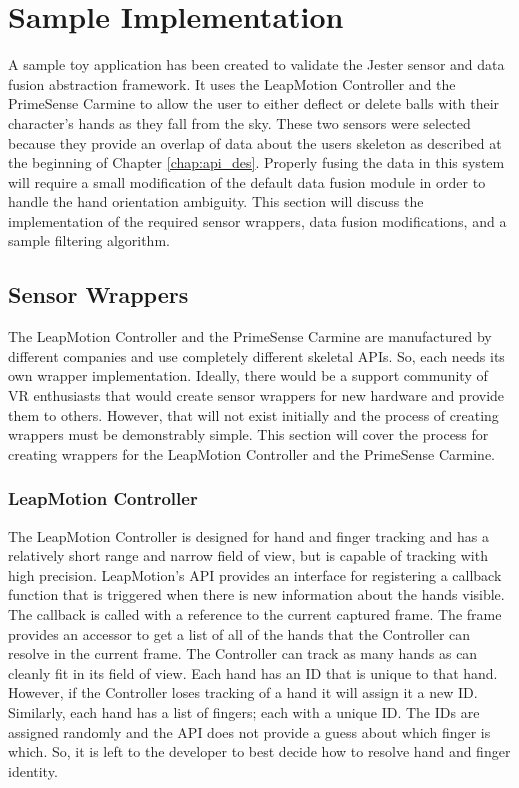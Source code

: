 \chapter{Sample Implementation}\label{chap:sample_app}

A sample toy application has been created to validate the Jester sensor and data fusion abstraction framework. It uses the LeapMotion Controller and the PrimeSense Carmine to allow the user to either deflect or delete balls with their character's hands as they fall from the sky. These two sensors were selected because they provide an overlap of data about the users skeleton as described at the beginning of Chapter \ref{chap:api_des}. Properly fusing the data in this system will require a small modification of the default data fusion module in order to handle the hand orientation ambiguity. This section will discuss the implementation of the required sensor wrappers, data fusion modifications, and a sample filtering algorithm.

\section{Sensor Wrappers}

The LeapMotion Controller and the PrimeSense Carmine are manufactured by different companies and use completely different skeletal APIs. So, each needs its own wrapper implementation. Ideally, there would be a support community of VR enthusiasts that would create sensor wrappers for new hardware and provide them to others. However, that will not exist initially and the process of creating wrappers must be demonstrably simple. This section will cover the process for creating wrappers for the LeapMotion Controller and the PrimeSense Carmine.

\subsection{LeapMotion Controller}\label{sec:leap_impl}

The LeapMotion Controller is designed for hand and finger tracking and has a relatively short range and narrow field of view, but is capable of tracking with high precision. LeapMotion's API provides an interface for registering a callback function that is triggered when there is new information about the hands visible. The callback is called with a reference to the current captured frame. The frame provides an accessor to get a list of all of the hands that the Controller can resolve in the current frame. The Controller can track as many hands as can cleanly fit in its field of view. Each hand has an ID that is unique to that hand. However, if the Controller loses tracking of a hand it will assign it a new ID. Similarly, each hand has a list of fingers; each with a unique ID. The IDs are assigned randomly and the API does not provide a guess about which finger is which. So, it is left to the developer to best decide how to resolve hand and finger identity.


